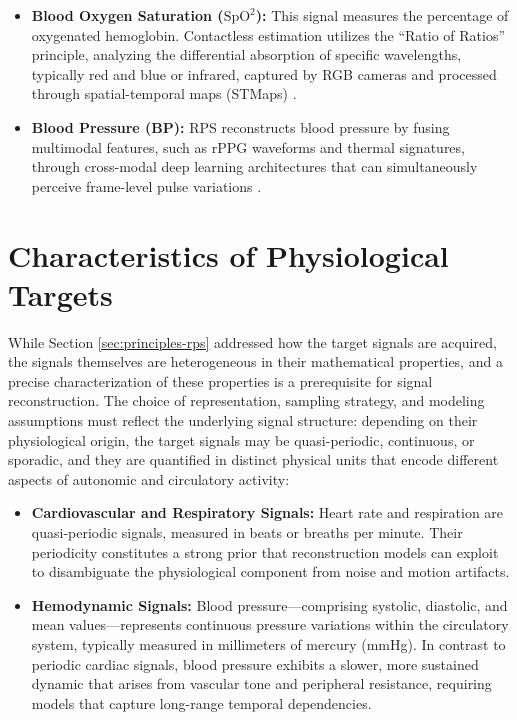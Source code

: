 \begin{itemize}
    \item \textbf{Blood Oxygen Saturation ($\text{SpO}^{2}$):} This signal
        measures the percentage of oxygenated hemoglobin. Contactless estimation
        utilizes the ``Ratio of Ratios'' principle, analyzing the differential
        absorption of specific wavelengths, typically red and blue or infrared,
        captured by RGB cameras and processed through spatial-temporal maps (STMaps)
        \cite{cheng2024contactless}.

    \item \textbf{Blood Pressure (BP):} RPS reconstructs blood pressure by fusing
        multimodal features, such as rPPG waveforms and thermal signatures, through
        cross-modal deep learning architectures that can simultaneously perceive
        frame-level pulse variations \cite{hassanpour2025contactless, cen2025robust}.
\end{itemize}

\section{Characteristics of Physiological Targets}
\label{sec:signal-characteristics}
While Section \ref{sec:principles-rps} addressed how the target signals are
acquired, the signals themselves are heterogeneous in their mathematical
properties, and a precise characterization of these properties is a prerequisite
for signal reconstruction. The choice of representation, sampling strategy, and
modeling assumptions must reflect the underlying signal structure: depending on
their physiological origin, the target signals may be quasi-periodic,
continuous, or sporadic, and they are quantified in distinct physical units that
encode different aspects of autonomic and circulatory activity:

\begin{itemize}
    \item \textbf{Cardiovascular and Respiratory Signals:} Heart rate and
        respiration are quasi-periodic signals, measured in beats or breaths
        per minute. Their periodicity constitutes a strong prior that
        reconstruction models can exploit to disambiguate the physiological
        component from noise and motion artifacts.

    \item \textbf{Hemodynamic Signals:} Blood pressure---comprising systolic,
        diastolic, and mean values---represents continuous pressure variations
        within the circulatory system, typically measured in millimeters of
        mercury (mmHg). In contrast to periodic cardiac signals, blood pressure
        exhibits a slower, more sustained dynamic that arises from vascular tone
        and peripheral resistance, requiring models that capture long-range
        temporal dependencies.
\end{itemize}

